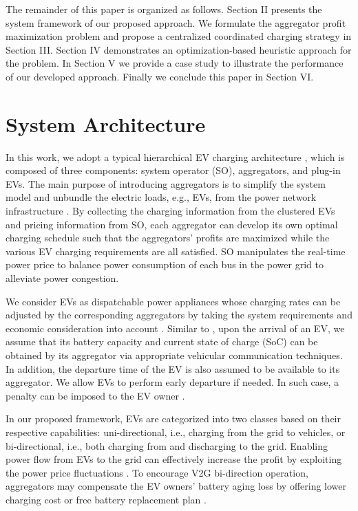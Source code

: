 \documentclass[conference]{IEEEtran}
\begin{document}
The remainder of this paper is organized as follows. Section II presents the system framework of our proposed approach. We formulate the aggregator profit maximization problem and propose a centralized coordinated charging strategy in Section III. Section IV demonstrates an optimization-based heuristic approach for the problem. In Section V we provide a case study to illustrate the performance of our developed approach. Finally we conclude this paper in Section VI.

	\section{System Architecture}
	






In this work, we adopt a typical hierarchical EV charging architecture \cite{Qi2014}, which is composed of three components: system operator (SO), aggregators, and plug-in EVs. The main purpose of introducing aggregators is to simplify the system model and unbundle the electric loads, e.g., EVs, from the power network infrastructure \cite{Hansen2015}. By collecting the charging information from the clustered EVs and pricing information from SO, each aggregator can develop its own optimal charging schedule such that the aggregators' profits are maximized while the various EV charging requirements are all satisfied. SO manipulates the real-time power price to balance power consumption of each bus in the power grid to alleviate power congestion.
	










We consider EVs as dispatchable power appliances whose charging rates can be adjusted by the corresponding aggregators by taking the system requirements and economic consideration into account \cite{Wen2012}. Similar to \cite{Lam2015}, upon the arrival of an EV, we assume that its battery capacity and current state of charge (SoC) can be obtained by its aggregator via appropriate vehicular communication techniques. In addition, the departure time of the EV is also assumed to be available to its aggregator. 
We allow EVs to perform early departure if needed. In such case, a penalty can be imposed to the EV owner \cite{Olivares2014}. 


	In our proposed framework, EVs are categorized into two classes based on their respective capabilities: uni-directional, i.e., charging from the grid to vehicles, or bi-directional, i.e., both charging from and discharging to the grid. Enabling power flow from EVs to the grid can effectively increase the profit by exploiting the power price fluctuations \cite{Han2010,Sortomme2011,Suekrue2015}. To encourage V2G bi-direction operation, aggregators may compensate the EV owners' battery aging loss by offering lower charging cost or free battery replacement plan \cite{Sortomme2012}.
	
\end{document}

